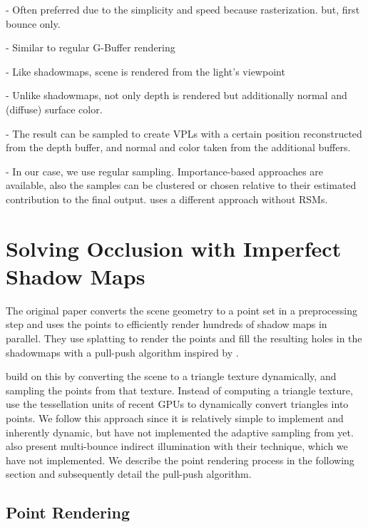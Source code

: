 - Often preferred due to the simplicity and speed because rasterization. but, first bounce only.

- Similar to regular G-Buffer rendering

- Like shadowmaps, scene is rendered from the light's viewpoint

- Unlike shadowmaps, not only depth is rendered but additionally normal and (diffuse) surface color.

- The result can be sampled to create VPLs with a certain position reconstructed from the depth buffer, and normal and color taken from the additional buffers.

- In our case, we use regular sampling. Importance-based approaches are available, also the samples can be clustered \cite{} or chosen relative to their estimated contribution to the final output. \citet{hedman2016sequential} uses a different approach without RSMs.


\section{Solving Occlusion with Imperfect Shadow Maps}
\label{sec:ISM}


The original paper \citep{ritschel2008ism} converts the scene geometry to a point set in a preprocessing step and uses the points to efficiently render hundreds of shadow maps in parallel. They use splatting to render the points and fill the resulting holes in the shadowmaps with a pull-push algorithm inspired by \citep{Marroquim:2007:reconstruction}.

\citet{ritschel2011ismsViewAdaptive} build on \citet{laine2007incremental} this by converting the scene to a triangle texture dynamically, and sampling the points from that texture. Instead of computing a triangle texture, \citet{barak2013temporally} use the tessellation units of recent GPUs to dynamically convert triangles into points.
We follow this approach since it is relatively simple to implement and inherently dynamic, but have not implemented the adaptive sampling from \citet{ritschel2011ismsViewAdaptive} yet.
\citep{ritschel2008ism} also present multi-bounce indirect illumination with their technique, which we have not implemented.
We describe the point rendering process in the following section and subsequently detail the pull-push algorithm.

\subsection{Point Rendering}

